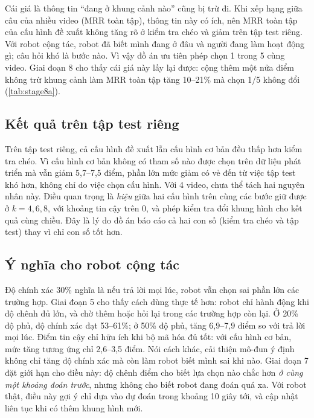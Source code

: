 \documentclass[a4paper,oneside]{report}
\begin{document}
Cái giá là thông tin ``đang ở khung cảnh nào'' cũng bị trừ đi. Khi xếp hạng giữa câu của nhiều video (MRR toàn tập), thông tin này có ích, nên MRR toàn tập của cấu hình đề xuất không tăng rõ ở kiểm tra chéo và giảm trên tập test riêng. Với robot cộng tác, robot đã biết mình đang ở đâu và người đang làm hoạt động gì; câu hỏi khó là bước nào. Vì vậy đồ án ưu tiên phép chọn 1 trong 5 cùng video. Giai đoạn 8 cho thấy cái giá này lấy lại được: cộng thêm một nửa điểm không trừ khung cảnh làm MRR toàn tập tăng 10--21\% mà chọn 1/5 không đổi (\cref{tab:stage8a}).

\subsection{Kết quả trên tập test riêng}

Trên tập test riêng, cả cấu hình đề xuất lẫn cấu hình cơ bản đều thấp hơn kiểm tra chéo. Vì cấu hình cơ bản không có tham số nào được chọn trên dữ liệu phát triển mà vẫn giảm 5,7--7,5 điểm, phần lớn mức giảm có vẻ đến từ việc tập test khó hơn, không chỉ do việc chọn cấu hình. Với 4 video, chưa thể tách hai nguyên nhân này. Điều quan trọng là \textit{hiệu} giữa hai cấu hình trên cùng các bước giữ được ở $k=4,6,8$, với khoảng tin cậy trên 0, và phép kiểm tra đổi khung hình cho kết quả cùng chiều. Đây là lý do đồ án báo cáo cả hai con số (kiểm tra chéo và tập test) thay vì chỉ con số tốt hơn.

\subsection{Ý nghĩa cho robot cộng tác}

Độ chính xác 30\% nghĩa là nếu trả lời mọi lúc, robot vẫn chọn sai phần lớn các trường hợp. Giai đoạn 5 cho thấy cách dùng thực tế hơn: robot chỉ hành động khi độ chênh đủ lớn, và chờ thêm hoặc hỏi lại trong các trường hợp còn lại. Ở 20\% độ phủ, độ chính xác đạt 53--61\%; ở 50\% độ phủ, tăng 6,9--7,9 điểm so với trả lời mọi lúc. Điểm tin cậy chỉ hữu ích khi bộ mã hóa đủ tốt: với cấu hình cơ bản, mức tăng tương ứng chỉ 2,6--3,5 điểm. Nói cách khác, cải thiện mô-đun ý định không chỉ tăng độ chính xác mà còn làm robot biết mình sai khi nào. Giai đoạn 7 đặt giới hạn cho điều này: độ chênh điểm cho biết lựa chọn nào chắc hơn \textit{ở cùng một khoảng đoán trước}, nhưng không cho biết robot đang đoán quá xa. Với robot thật, điều này gợi ý chỉ dựa vào dự đoán trong khoảng 10 giây tới, và cập nhật liên tục khi có thêm khung hình mới.
\end{document}
